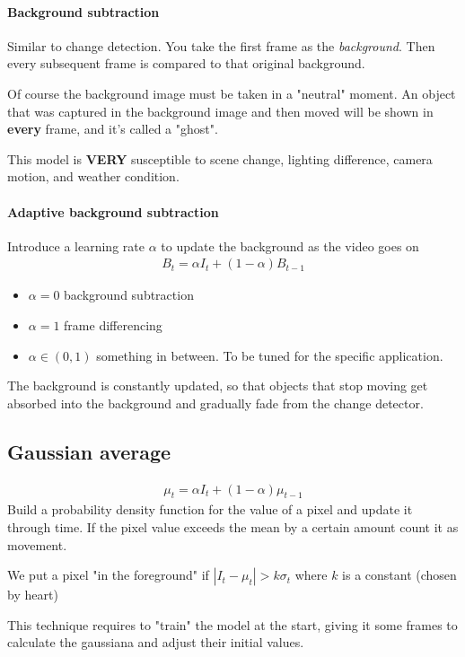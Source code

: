 \documentclass{article}
\begin{document}
\paragraph{Background subtraction}
Similar to change detection. You take the first frame as the \textit{background}. Then every subsequent frame is compared to that original background.

Of course the background image must be taken in a "neutral" moment. An object that was captured in the background image and then moved will be shown in \textbf{every} frame, and it's called a "ghost".

This model is \textbf{VERY} susceptible to scene change, lighting difference, camera motion, and weather condition.

\paragraph{Adaptive background subtraction}
Introduce a learning rate $\alpha$ to update the background as the video goes on
\begin{align*}
    B_t = \alpha I_t + (1-\alpha) B_{t-1}
\end{align*}
\begin{itemize}
    \item $\alpha=0$ background subtraction
    \item $\alpha=1$ frame differencing
    \item $\alpha\in(0,1)$ something in between. To be tuned for the specific application.
\end{itemize}
The background is constantly updated, so that objects that stop moving get absorbed into the background and gradually fade from the change detector.

\subsection{Gaussian average}
\begin{align*}
    \mu_t = \alpha I_t + (1-\alpha)\mu_{t-1}
\end{align*}
Build a probability density function for the value of a pixel and update it through time. If the pixel value exceeds the mean by a certain amount count it as movement.

We put a pixel "in the foreground" if $|I_t - \mu_t| > k\sigma_t$ where $k$ is a constant (chosen by heart)

This technique requires to "train" the model at the start, giving it some frames to calculate the gaussiana and adjust their initial values.
\end{document}

